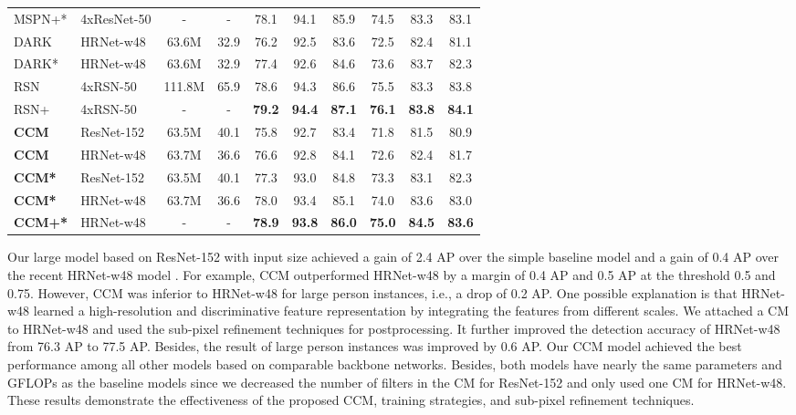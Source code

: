 \documentclass[twocolumn]{svjour3}          \smartqed  \usepackage{natbib}
\begin{document}
\begin{table*}[htbp]
\begin{tabular}{llcccccccc}
    MSPN+* \citep{li2019rethinking} & 4xResNet-50 & - & - &78.1  &{94.1}       &{85.9}       &74.5       &{83.3}       &{83.1} \\
    DARK \citep{zhang2020distribution} & HRNet-w48 & 63.6M & 32.9 & 76.2     &  92.5     &  83.6     &  72.5     &  82.4    & 81.1 \\
    DARK* \citep{zhang2020distribution} & HRNet-w48 &  63.6M & 32.9 & 77.4 &  92.6     &  84.6     &  73.6     &  83.7    & 82.3 \\
    RSN \citep{cai2020learning} & 4xRSN-50 & 111.8M & 65.9 & 78.6  & 94.3      &86.6     &75.5     &83.3       &83.8 \\
    RSN+ \citep{cai2020learning} & 4xRSN-50 & - & - &\textbf{79.2}  &\textbf{94.4}       &\textbf{87.1}       &\textbf{76.1}       &\textbf{83.8}       &\textbf{84.1} \\
    \midrule
    \midrule
    \textbf{CCM} & ResNet-152 & 63.5M & 40.1 &  75.8   &  92.7     &  83.4     &  71.8     &  81.5   & 80.9 \\
    \textbf{CCM} & HRNet-w48 & 63.7M & 36.6 & 76.6    &  92.8     &  84.1     &  72.6     &  82.4    & 81.7 \\
    \textbf{CCM*} & ResNet-152 & 63.5M & 40.1 & 77.3    &  93.0     &  84.8     &  73.3     &  83.1   & 82.3 \\
    \textbf{CCM*}  & HRNet-w48 & 63.7M & 36.6 & 78.0   &  93.4     &  85.1     &  74.0    &  83.6    & 83.0 \\
    \textbf{CCM+*} & HRNet-w48& - & - & \textbf{78.9}    &  \textbf{93.8}     &  \textbf{86.0}     &  \textbf{75.0}     &  \textbf{84.5}    & \textbf{83.6} \\
    \bottomrule
    \end{tabular}\label{tab:SOTA_test}\end{table*}

Our large model based on ResNet-152 with input size  achieved a gain of 2.4 AP over the simple baseline model \citep{xiao2018simple} and a gain of 0.4 AP over the recent HRNet-w48 model \citep{sun2019deep}. For example, CCM outperformed HRNet-w48 by a margin of 0.4 AP and 0.5 AP at the threshold 0.5 and 0.75. However, CCM was inferior to HRNet-w48 for large person instances, i.e., a drop of 0.2 AP. One possible explanation is that HRNet-w48 learned a high-resolution and discriminative feature representation by integrating the features from different scales. We attached a CM to HRNet-w48 and used the sub-pixel refinement techniques for postprocessing. It further improved the detection accuracy of HRNet-w48 from 76.3 AP to 77.5 AP. Besides, the result of large person instances was improved by 0.6 AP. Our CCM model achieved the best performance among all other models based on comparable backbone networks. Besides, both models have nearly the same parameters and GFLOPs as the baseline models since we decreased the number of filters in the CM for ResNet-152 and only used one CM for HRNet-w48. These results demonstrate the effectiveness of the proposed CCM, training strategies, and sub-pixel refinement techniques. 
\end{document}
